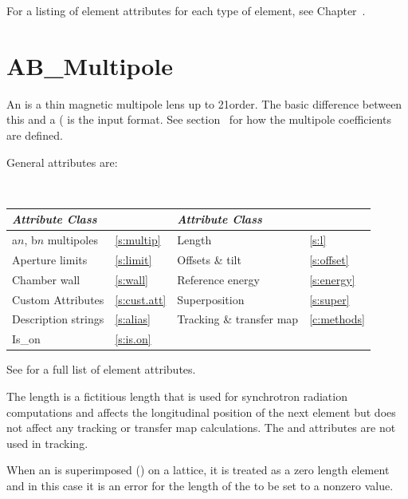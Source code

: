 For a listing of element attributes for each type of element, see Chapter~.

\section{AB_Multipole}
\label{s:ab.m}

An  is a thin magnetic multipole lens up to 21\St order. The
basic difference between this and a  ( is
the input format. See section~ for how the multipole
coefficients are defined.

General  attributes are:
\begin{center}
\tt 
\begin{tabular}{llll} \toprule
  {\sl Attribute Class}      & \s               & {\sl Attribute Class}      & \s              \\ \midrule
  a$n$, b$n$ multipoles      & \ref{s:multip}   & Length                     & \ref{s:l}       \\
  Aperture limits            & \ref{s:limit}    & Offsets \& tilt            & \ref{s:offset}  \\
  Chamber wall               & \ref{s:wall}     & Reference energy           & \ref{s:energy}  \\ 
  Custom Attributes          & \ref{s:cust.att} & Superposition              & \ref{s:super}   \\
  Description strings        & \ref{s:alias}    & Tracking \& transfer map   & \ref{c:methods} \\
  Is_on                      & \ref{s:is.on}    &                            &                 \\
  \bottomrule
\end{tabular}
\end{center}
\toffset
See  for a full list of element attributes.

The length  is a fictitious length that is used for synchrotron
radiation computations and affects the longitudinal position of the
next element but does not affect any tracking or transfer map
calculations.  The  and  attributes are not
used in tracking.

When an  is superimposed () on a lattice, it is
treated as a zero length element and in this case it is an error for the length
of the  to be set to a nonzero value.

